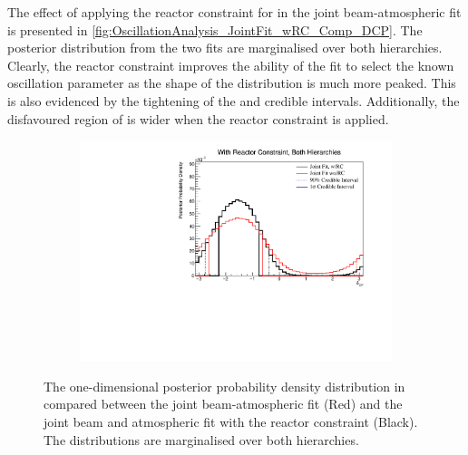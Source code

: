 The effect of applying the reactor constraint for  in the joint beam-atmospheric fit is presented in \autoref{fig:OscillationAnalysis_JointFit_wRC_Comp_DCP}. The posterior distribution from the two fits are marginalised over both hierarchies. Clearly, the reactor constraint improves the ability of the fit to select the known oscillation parameter as the shape of the distribution is much more peaked. This is also evidenced by the tightening of the \quickmath{1\sigma} and  credible intervals. Additionally, the disfavoured region of  is wider when the reactor constraint is applied. 

\begin{figure}[h]
  \begin{subfigure}[t]{0.98\textwidth}
    \includegraphics[width=\textwidth, trim={0mm 0mm 0mm 0mm}, clip,page=1]{Figures/OA/JointFit_wRC_Comp/ContourComparison_1D_dcp_BH_2_wRC_woRC_UnSmeared_CredibleInterval.pdf}
  \end{subfigure}
  \caption{The one-dimensional posterior probability density distribution in  compared between the joint beam-atmospheric fit (Red) and the joint beam and atmospheric fit with the reactor constraint (Black). The distributions are marginalised over both hierarchies.}
  \label{fig:OscillationAnalysis_JointFit_wRC_Comp_DCP}
\end{figure}

